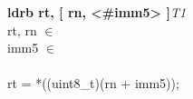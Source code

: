 


\begin{instructionblock}{\imagewidth}%
    \textbf{ldrb rt, [ rn, <\#imm5> ]}\hfill\textit{T1}\\
    rt, rn $\in$ \baseregisters\\
    imm5 $\in$ \immFive\\
    {}\\
    rt = *((uint8\_t)(rn + imm5));
\end{instructionblock}

